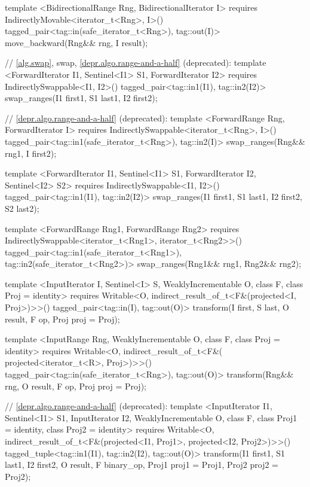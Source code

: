 \begin{codeblock}
{{{{  template <BidirectionalRange Rng, BidirectionalIterator I>
    requires IndirectlyMovable<iterator_t<Rng>, I>()
    tagged_pair<tag::in(safe_iterator_t<Rng>), tag::out(I)>
      move_backward(Rng&& rng, I result);

  // \ref{alg.swap}, swap, \ref{depr.algo.range-and-a-half} (deprecated):
  template <ForwardIterator I1, Sentinel<I1> S1, ForwardIterator I2>
    requires IndirectlySwappable<I1, I2>()
    tagged_pair<tag::in1(I1), tag::in2(I2)>
      swap_ranges(I1 first1, S1 last1, I2 first2);

  // \ref{depr.algo.range-and-a-half} (deprecated):
  template <ForwardRange Rng, ForwardIterator I>
    requires IndirectlySwappable<iterator_t<Rng>, I>()
    tagged_pair<tag::in1(safe_iterator_t<Rng>), tag::in2(I)>
      swap_ranges(Rng&& rng1, I first2);

  template <ForwardIterator I1, Sentinel<I1> S1, ForwardIterator I2, Sentinel<I2> S2>
    requires IndirectlySwappable<I1, I2>()
    tagged_pair<tag::in1(I1), tag::in2(I2)>
      swap_ranges(I1 first1, S1 last1, I2 first2, S2 last2);

  template <ForwardRange Rng1, ForwardRange Rng2>
    requires IndirectlySwappable<iterator_t<Rng1>, iterator_t<Rng2>>()
    tagged_pair<tag::in1(safe_iterator_t<Rng1>), tag::in2(safe_iterator_t<Rng2>)>
      swap_ranges(Rng1&& rng1, Rng2&& rng2);

  template <InputIterator I, Sentinel<I> S, WeaklyIncrementable O, class F, class Proj = identity>
    requires Writable<O, indirect_result_of_t<F&(projected<I, Proj>)>>()
    tagged_pair<tag::in(I), tag::out(O)>
      transform(I first, S last, O result, F op, Proj proj = Proj{});

  template <InputRange Rng, WeaklyIncrementable O, class F, class Proj = identity>
    requires Writable<O, indirect_result_of_t<F&(
      projected<iterator_t<R>, Proj>)>>()
    tagged_pair<tag::in(safe_iterator_t<Rng>), tag::out(O)>
      transform(Rng&& rng, O result, F op, Proj proj = Proj{});

  // \ref{depr.algo.range-and-a-half} (deprecated):
  template <InputIterator I1, Sentinel<I1> S1, InputIterator I2, WeaklyIncrementable O,
      class F, class Proj1 = identity, class Proj2 = identity>
    requires Writable<O, indirect_result_of_t<F&(projected<I1, Proj1>,
      projected<I2, Proj2>)>>()
    tagged_tuple<tag::in1(I1), tag::in2(I2), tag::out(O)>
      transform(I1 first1, S1 last1, I2 first2, O result,
                F binary_op, Proj1 proj1 = Proj1{}, Proj2 proj2 = Proj2{});

}}}}
\end{codeblock}
